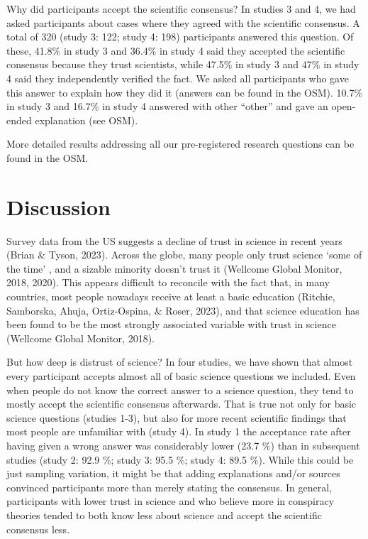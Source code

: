 \documentclass[
  doc,floatsintext]{apa6}
\begin{document}
Why did participants accept the scientific consensus? In studies 3 and 4, we had asked participants about cases where they agreed with the scientific consensus. A total of 320 (study 3: 122; study 4: 198) participants answered this question. Of these, 41.8\% in study 3 and 36.4\% in study 4 said they accepted the scientific consensus because they trust scientists, while 47.5\% in study 3 and 47\% in study 4 said they independently verified the fact. We asked all participants who gave this answer to explain how they did it (answers can be found in the OSM). 10.7\% in study 3 and 16.7\% in study 4 answered with other ``other'' and gave an open-ended explanation (see OSM).

More detailed results addressing all our pre-registered research questions can be found in the OSM.

\section{Discussion}\label{discussion}

Survey data from the US suggests a decline of trust in science in recent years (Brian \& Tyson, 2023). Across the globe, many people only trust science `some of the time' , and a sizable minority doesn't trust it (Wellcome Global Monitor, 2018, 2020). This appears difficult to reconcile with the fact that, in many countries, most people nowadays receive at least a basic education (Ritchie, Samborska, Ahuja, Ortiz-Ospina, \& Roser, 2023), and that science education has been found to be the most strongly associated variable with trust in science (Wellcome Global Monitor, 2018).

But how deep is distrust of science? In four studies, we have shown that almost every participant accepts almost all of basic science questions we included. Even when people do not know the correct answer to a science question, they tend to mostly accept the scientific consensus afterwards. That is true not only for basic science questions (studies 1-3), but also for more recent scientific findings that most people are unfamiliar with (study 4). In study 1 the acceptance rate after having given a wrong answer was considerably lower (23.7 \%) than in subsequent studies (study 2: 92.9 \%; study 3: 95.5 \%; study 4: 89.5 \%). While this could be just sampling variation, it might be that adding explanations and/or sources convinced participants more than merely stating the consensus. In general, participants with lower trust in science and who believe more in conspiracy theories tended to both know less about science and accept the scientific consensus less.
\end{document}
